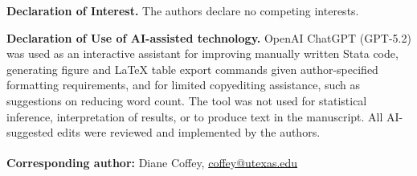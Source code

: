 \documentclass[12pt]{article}
\begin{document}
\vspace{1em}

\noindent\textbf{Declaration of Interest.}  
The authors declare no competing interests.

\vspace{1em}

\noindent\textbf{Declaration of Use of AI-assisted technology.}  
OpenAI ChatGPT (GPT-5.2) was used as an interactive assistant for improving manually written Stata code, generating figure and LaTeX table export commands given author-specified formatting requirements, and for limited copyediting assistance, such as suggestions on reducing word count. The tool was not used for statistical inference, interpretation of results, or to produce text in the manuscript. All AI-suggested edits were reviewed and implemented by the authors.

\vspace{1.5em}


\noindent\textsuperscript{}\textbf{Corresponding author:} Diane Coffey, \href{mailto:coffey@utexas.edu}{coffey@utexas.edu}
\end{document}
